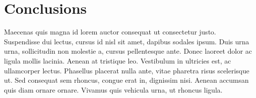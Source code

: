 
\chapter{Conclusions}
Maecenas quis magna id lorem auctor consequat ut consectetur justo. Suspendisse dui lectus, cursus id nisl sit amet, dapibus sodales ipsum. Duis urna urna, sollicitudin non molestie a, cursus pellentesque ante. Donec laoreet dolor ac ligula mollis lacinia. Aenean at tristique leo. Vestibulum in ultricies est, ac ullamcorper lectus. Phasellus placerat nulla ante, vitae pharetra risus scelerisque ut. Sed consequat sem rhoncus, congue erat in, dignissim nisi. Aenean accumsan quis diam ornare ornare. Vivamus quis vehicula urna, ut rhoncus ligula. 


